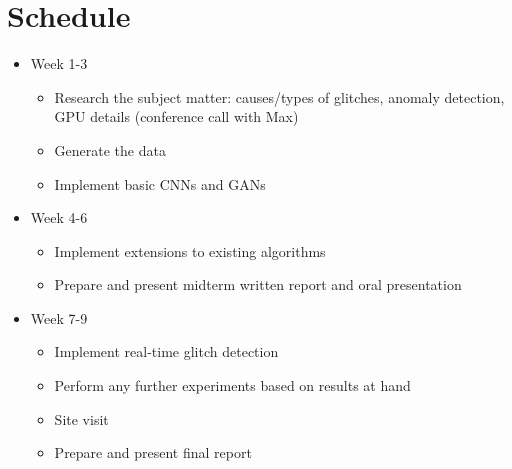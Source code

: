 \documentclass[12pt]{article}
\begin{document}
\section{Schedule}
\begin{itemize}
    \item Week 1-3
    \begin{itemize}
         \item Research the subject matter: causes/types of glitches, anomaly detection, GPU details (conference call with Max)
         \item Generate the data
         \item Implement basic CNNs and GANs
    \end{itemize}
    
    \item Week 4-6
    \begin{itemize}
         \item Implement extensions to existing algorithms
         \item Prepare and present midterm written report and oral presentation 
    \end{itemize}
    \item Week 7-9
    \begin{itemize}
        
         \item Implement real-time glitch detection
         \item Perform any further experiments based on results at hand
          \item Site visit
         \item Prepare and present final report
         
         
    \end{itemize}
\end{itemize}
\end{document}
